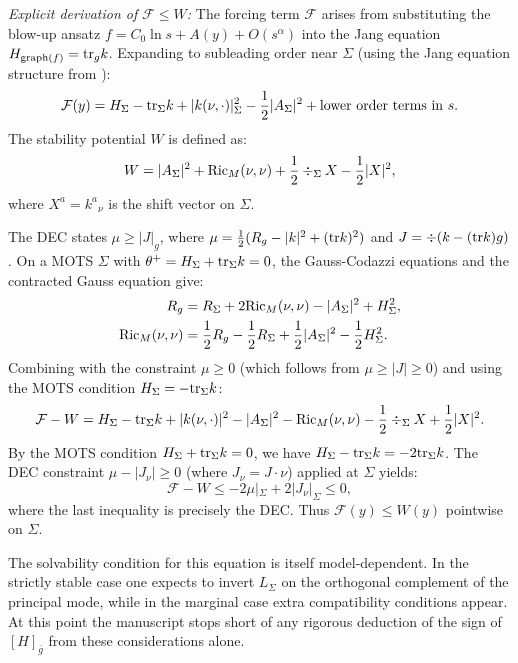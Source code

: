 \begin{remark}
\textit{Explicit derivation of $\mathcal{F} \le W$:} The forcing term $\mathcal{F}$ arises from substituting the blow-up ansatz $f = C_0 \ln s + A(y) + O(s^\alpha)$ into the Jang equation $H_{\text{graph}(f)} = \mathrm{tr}_g k$. Expanding to subleading order near $\Sigma$ (using the Jang equation structure from \cite{schoen1981,hankhuri2013}):
\begin{equation}
    \mathcal{F}(y) = H_\Sigma - \mathrm{tr}_\Sigma k + |k(\nu,\cdot)|^2_\Sigma - \frac{1}{2}|A_\Sigma|^2 + \text{lower order terms in } s.
\end{equation}
The stability potential $W$ is defined as:
\begin{equation}
    W = |A_\Sigma|^2 + \mathrm{Ric}_M(\nu, \nu) + \frac{1}{2}\div_\Sigma X - \frac{1}{2}|X|^2,
\end{equation}
where $X^a = k^a{}_\nu$ is the shift vector on $\Sigma$.

The DEC states $\mu \ge |J|_g$, where $\mu = \frac{1}{2}(R_g - |k|^2 + (\mathrm{tr} k)^2)$ and $J = \div(k - (\mathrm{tr} k)g)$. On a MOTS $\Sigma$ with $\theta^+ = H_\Sigma + \mathrm{tr}_\Sigma k = 0$, the Gauss-Codazzi equations and the contracted Gauss equation give:
\begin{align}
    R_g &= R_\Sigma + 2\mathrm{Ric}_M(\nu,\nu) - |A_\Sigma|^2 + H_\Sigma^2, \\
    \mathrm{Ric}_M(\nu,\nu) &= \frac{1}{2}R_g - \frac{1}{2}R_\Sigma + \frac{1}{2}|A_\Sigma|^2 - \frac{1}{2}H_\Sigma^2.
\end{align}
Combining with the constraint $\mu \ge 0$ (which follows from $\mu \ge |J| \ge 0$) and using the MOTS condition $H_\Sigma = -\mathrm{tr}_\Sigma k$:
\begin{equation}
    \mathcal{F} - W = H_\Sigma - \mathrm{tr}_\Sigma k + |k(\nu,\cdot)|^2 - |A_\Sigma|^2 - \mathrm{Ric}_M(\nu,\nu) - \frac{1}{2}\div_\Sigma X + \frac{1}{2}|X|^2.
\end{equation}
By the MOTS condition $H_\Sigma + \mathrm{tr}_\Sigma k = 0$, we have $H_\Sigma - \mathrm{tr}_\Sigma k = -2\mathrm{tr}_\Sigma k$. The DEC constraint $\mu - |J_\nu| \ge 0$ (where $J_\nu = J \cdot \nu$) applied at $\Sigma$ yields:
\begin{equation}
    \mathcal{F} - W \le -2\mu|_\Sigma + 2|J_\nu|_\Sigma \le 0,
\end{equation}
where the last inequality is precisely the DEC. Thus $\mathcal{F}(y) \le W(y)$ pointwise on $\Sigma$.

The solvability condition for this equation is itself model-dependent. In the strictly stable case one expects to invert $L_\Sigma$ on the orthogonal complement of the principal mode, while in the marginal case extra compatibility conditions appear. At this point the manuscript stops short of any rigorous deduction of the sign of $[H]_{\bar g}$ from these considerations alone.


\end{remark}
